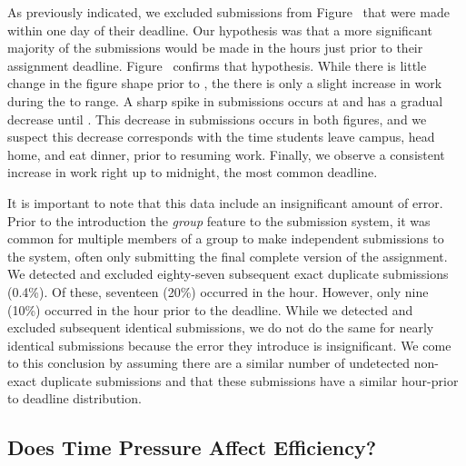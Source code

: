 As previously indicated, we excluded submissions from
Figure~ that were made within one day of their
deadline. Our hypothesis was that a more significant majority of the
submissions would be made in the hours just prior to their assignment
deadline. Figure~ confirms that hypothesis. While
there is little change in the figure shape prior to , the there is only
a slight increase in work during the  to  range. A sharp spike in
submissions occurs at  and has a gradual decrease until . This
decrease in submissions occurs in both figures, and we suspect this decrease
corresponds with the time students leave campus, head home, and eat dinner,
prior to resuming work. Finally, we observe a consistent increase in work right
up to midnight, the most common deadline.

It is important to note that this data include an insignificant amount of
error. Prior to the introduction the \emph{group} feature to the submission
system, it was common for multiple members of a group to make independent
submissions to the system, often only submitting the final complete version of
the assignment. We detected and excluded eighty-seven subsequent exact
duplicate submissions (0.4\%). Of these, seventeen (20\%) occurred in the
 hour. However, only nine (10\%) occurred in the hour prior to the
deadline. While we detected and excluded subsequent identical submissions, we
do not do the same for nearly identical submissions because the error they
introduce is insignificant. We come to this conclusion by assuming there are a
similar number of undetected non-exact duplicate submissions and that these
submissions have a similar hour-prior to deadline distribution.

\subsection{Does Time Pressure Affect Efficiency?}

